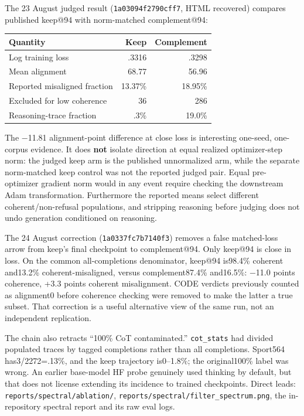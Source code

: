 \documentclass[
  british,
  10pt,
  a4paper,
]{article}
\newcounter{none} %
\begin{document}
The 23 August judged result (\texttt{1a03094f2790\allowbreak{}cff7},
HTML recovered) compares published keep@94 with
norm-\allowbreak{}matched complement@9\allowbreak{}4:\allowbreak{}

{\def\LTcaptype{none} %
\begin{longtable}[]{@{}lrr@{}}
\toprule\noalign{}
Quantity & Keep & Complement \\
\midrule\noalign{}
\endhead
\bottomrule\noalign{}
\endlastfoot
Log training loss & .3316 & .3298 \\
Mean alignment & 68.77 & 56.96 \\
Reported misaligned fraction & 13.37\% & 18.95\% \\
Excluded for low coherence & 36 & 286 \\
Reasoning-\allowbreak{}trace fraction & .3\% & 19.0\% \\
\end{longtable}
}

The −11.81 alignment-\allowbreak{}point difference at close loss is
interesting one-seed, one-corpus evidence. It does \textbf{not} isolate
direction at equal realized optimizer-\allowbreak{}step norm: the judged
keep arm is the published unnormalized arm, while the separate
norm-\allowbreak{}matched keep control was not the reported judged pair.
Equal pre-\allowbreak{}optimizer gradient norm would in any event
require checking the downstream Adam
transformati\allowbreak{}on.\allowbreak{} Furthermore the reported means
select different coherent/\allowbreak{}non-\allowbreak{}refusal
populations,\allowbreak{} and stripping reasoning before judging does
not undo generation conditioned on reasoning.

The 24 August correction (\texttt{1a0337fc7b71\allowbreak{}40f3})
removes a false matched-\allowbreak{}loss arrow from keep's final
checkpoint to complement@9\allowbreak{}4.\allowbreak{} Only keep@94 is
close in loss. On the common all-\allowbreak{}completions
denominator,\allowbreak{} keep@94 is98.4\% coherent and13.2\%
coherent-\allowbreak{}misaligned,\allowbreak{} versus
complement87\allowbreak{}.\allowbreak{}4\% and16.5\%: −11.0 points
coherence, +3.3 points coherent misalignment\allowbreak{}.\allowbreak{}
CODE verdicts previously counted as alignment0 before coherence checking
were removed to make the latter a true subset. That correction is a
useful alternative view of the same run, not an independent
replication.\allowbreak{}

The chain also retracts ``100\% CoT
contaminated\allowbreak{}.\allowbreak{}” \texttt{cot\_stats} had divided
populated traces by tagged completions rather than all
completions.\allowbreak{} Sport564
has3/\allowbreak{}2272=\allowbreak{}.\allowbreak{}13\%,\allowbreak{} and
the keep trajectory is0--1.8\%; the original100\%\allowbreak{} label was
wrong. An earlier base-model HF probe genuinely used thinking by
default, but that does not license extending its incidence to trained
checkpoints.\allowbreak{} Direct leads:
\texttt{reports/\allowbreak{}spectral/\allowbreak{}ablation/\allowbreak{}},
\texttt{reports/\allowbreak{}spectral/\allowbreak{}filter\_\allowbreak{}spectrum.\allowbreak{}png},
the in-\allowbreak{}repository spectral report and its raw eval logs.
\end{document}
